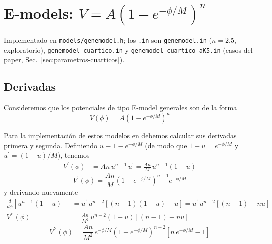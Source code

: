     \section{E-models: $V = A(1 - e^{-\phi/M})^n$}
        \label{sec:emodel}

        Implementado en \texttt{models/genemodel.h}; los \texttt{.in} son \texttt{genemodel.in} ($n = 2.5$, exploratorio), \texttt{genemodel\_cuartico.in} y \texttt{genemodel\_cuartico\_aK5.in} (casos del paper, Sec.~\ref{sec:parametros-cuarticos}).

        \subsection{Derivadas}

            Consideremos que los potenciales de tipo E-model generales son de la forma
            \begin{equation}
                V(\phi) = A \left( 1 - e^{-\phi/M} \right)^n
            \end{equation}

            Para la implementación de estos modelos en \CosmoLattice debemos calcular sus derivadas primera y segunda. Definiendo $u \equiv 1 - e^{-\phi/M}$ (de modo que $1 - u = e^{-\phi/M}$ y $u^\prime = (1-u)/M$), tenemos
            \begin{equation*}
                \begin{split}
                    V^\prime (\phi) &= A n \, u^{n-1} \, u^\prime = \frac{An}{M} \, u^{n-1} (1-u)
                \end{split}
            \end{equation*}
            \begin{equation}
                V^\prime (\phi) = \frac{A n}{M} \left( 1 - e^{-\phi/M} \right)^{n-1} e^{-\phi/M}
            \end{equation}
            y derivando nuevamente
            \begin{equation*}
                \begin{split}
                    \frac{d}{d\phi} \left[ u^{n-1} (1-u) \right] &= u^\prime \, u^{n-2} \left[ (n-1)(1-u) - u \right] = u^\prime \, u^{n-2} \left[ (n-1) - n u \right]\\
                    V^{\prime\prime} (\phi) &= \frac{An}{M^2} \, u^{n-2} (1-u) \left[ (n-1) - n u \right]
                \end{split}
            \end{equation*}
            \begin{equation}
                V^{\prime \prime} (\phi) = \frac{A n}{M^2} \, e^{-\phi/M} \left( 1 - e^{-\phi/M} \right)^{n-2} \left[ n \, e^{-\phi/M} - 1 \right]
            \end{equation}


